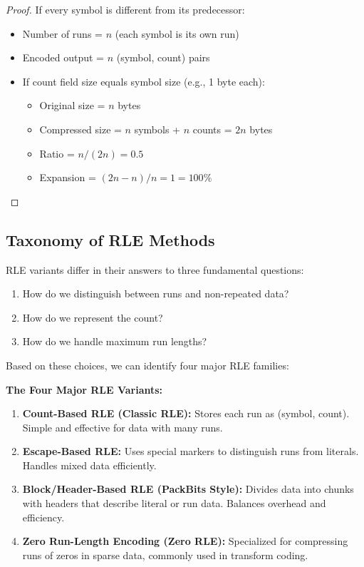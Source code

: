 \begin{proof}
If every symbol is different from its predecessor:
\begin{itemize}
    \item Number of runs = $n$ (each symbol is its own run)
    \item Encoded output = $n$ (symbol, count) pairs
    \item If count field size equals symbol size (e.g., 1 byte each):
    \begin{itemize}
        \item Original size = $n$ bytes
        \item Compressed size = $n$ symbols + $n$ counts = $2n$ bytes
        \item Ratio = $n/(2n) = 0.5$
        \item Expansion = $(2n - n)/n = 1 = 100\%$
    \end{itemize}
\end{itemize}
\end{proof}

\subsection{Taxonomy of RLE Methods}

RLE variants differ in their answers to three fundamental questions:
\begin{enumerate}
    \item How do we distinguish between runs and non-repeated data?
    \item How do we represent the count?
    \item How do we handle maximum run lengths?
\end{enumerate}

Based on these choices, we can identify four major RLE families:

\begin{importantbox}
\textbf{The Four Major RLE Variants:}

\begin{enumerate}
    \item \textbf{Count-Based RLE (Classic RLE):} Stores each run as (symbol, count). Simple and effective for data with many runs.
    
    \item \textbf{Escape-Based RLE:} Uses special markers to distinguish runs from literals. Handles mixed data efficiently.
    
    \item \textbf{Block/Header-Based RLE (PackBits Style):} Divides data into chunks with headers that describe literal or run data. Balances overhead and efficiency.
    
    \item \textbf{Zero Run-Length Encoding (Zero RLE):} Specialized for compressing runs of zeros in sparse data, commonly used in transform coding.
\end{enumerate}
\end{importantbox}

